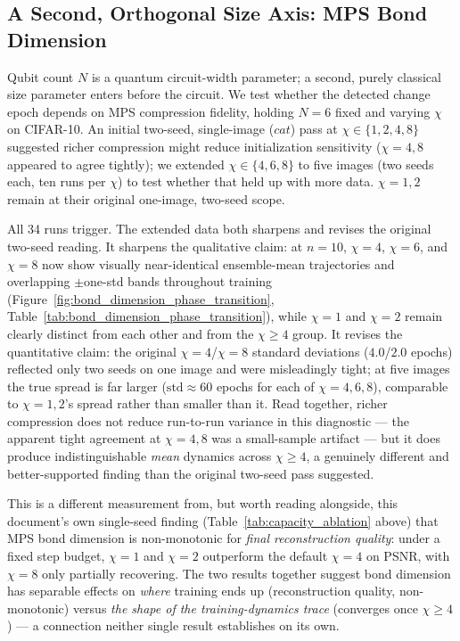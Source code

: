 \documentclass[11pt]{article}
\begin{document}
\subsection{A Second, Orthogonal Size Axis: MPS Bond Dimension}
\label{sec:bond_dimension_phase_transition}
Qubit count $N$ is a quantum circuit-width parameter; a second, purely classical size parameter enters before the circuit. We test whether the detected change epoch depends on MPS compression fidelity, holding $N=6$ fixed and varying $\chi$ on CIFAR-10. An initial two-seed, single-image ($\textit{cat}$) pass at $\chi\in\{1,2,4,8\}$ suggested richer compression might reduce initialization sensitivity ($\chi=4,8$ appeared to agree tightly); we extended $\chi\in\{4,6,8\}$ to five images (two seeds each, ten runs per $\chi$) to test whether that held up with more data. $\chi=1,2$ remain at their original one-image, two-seed scope.

All 34 runs trigger. The extended data both sharpens and revises the original two-seed reading. It sharpens the qualitative claim: at $n=10$, $\chi=4$, $\chi=6$, and $\chi=8$ now show visually near-identical ensemble-mean trajectories and overlapping $\pm$one-std bands throughout training (Figure~\ref{fig:bond_dimension_phase_transition}, Table~\ref{tab:bond_dimension_phase_transition}), while $\chi=1$ and $\chi=2$ remain clearly distinct from each other and from the $\chi\geq4$ group. It revises the quantitative claim: the original $\chi=4$/$\chi=8$ standard deviations ($4.0$/$2.0$ epochs) reflected only two seeds on one image and were misleadingly tight; at five images the true spread is far larger ($\mathrm{std}\approx60$ epochs for each of $\chi=4,6,8$), comparable to $\chi=1,2$'s spread rather than smaller than it. Read together, richer compression does not reduce run-to-run variance in this diagnostic --- the apparent tight agreement at $\chi=4,8$ was a small-sample artifact --- but it does produce indistinguishable \emph{mean} dynamics across $\chi\geq4$, a genuinely different and better-supported finding than the original two-seed pass suggested.

This is a different measurement from, but worth reading alongside, this document's own single-seed finding (Table~\ref{tab:capacity_ablation} above) that MPS bond dimension is non-monotonic for \emph{final reconstruction quality}: under a fixed step budget, $\chi=1$ and $\chi=2$ outperform the default $\chi=4$ on PSNR, with $\chi=8$ only partially recovering. The two results together suggest bond dimension has separable effects on \emph{where} training ends up (reconstruction quality, non-monotonic) versus \emph{the shape of the training-dynamics trace} (converges once $\chi\geq4$) --- a connection neither single result establishes on its own.
\end{document}
